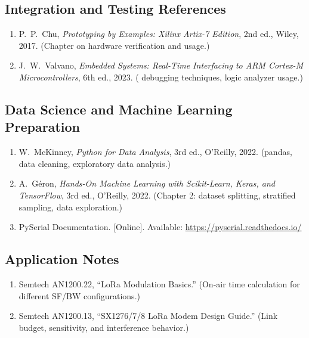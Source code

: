 \documentclass[11pt,letterpaper]{article}
\begin{document}
	\subsection{Integration and Testing References}

	\begin{enumerate}[leftmargin=2em]
		\item P.\ P.\ Chu, \textit{\FPGA{} Prototyping by \VHDL{} Examples: Xilinx Artix-7 Edition}, 2nd ed., Wiley, 2017. (Chapter on hardware verification and \ILA{} usage.)
		\item J.\ W.\ Valvano, \textit{Embedded Systems: Real-Time Interfacing to ARM Cortex-M Microcontrollers}, 6th ed., 2023. (\UART{} debugging techniques, logic analyzer usage.)
	\end{enumerate}

	\subsection{Data Science and Machine Learning Preparation}

	\begin{enumerate}[leftmargin=2em]
		\item W.\ McKinney, \textit{Python for Data Analysis}, 3rd ed., O'Reilly, 2022. (pandas, data cleaning, exploratory data analysis.)
		\item A.\ G\'eron, \textit{Hands-On Machine Learning with Scikit-Learn, Keras, and TensorFlow}, 3rd ed., O'Reilly, 2022. (Chapter 2: dataset splitting, stratified sampling, data exploration.)
		\item PySerial Documentation. [Online]. Available: \url{https://pyserial.readthedocs.io/}
	\end{enumerate}

	\subsection{Application Notes}

	\begin{enumerate}[leftmargin=2em]
		\item Semtech AN1200.22, ``LoRa Modulation Basics.'' (On-air time calculation for different SF/BW configurations.)
		\item Semtech AN1200.13, ``SX1276/7/8 LoRa Modem Design Guide.'' (Link budget, sensitivity, and interference behavior.)
	\end{enumerate}

	\newpage
\end{document}
